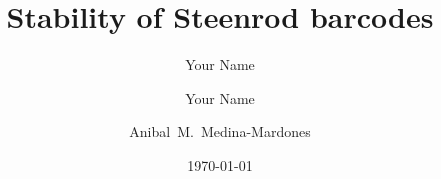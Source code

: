 \documentclass{amsart}
\title{Stability of Steenrod barcodes}
\author[Your short name]{Your Name}
\author[Your short name]{Your Name}
\author[A.~Medina-Mardones]{Anibal~M.~Medina-Mardones}
\date{\today}
\begin{document}
	
	\maketitle
	
	
	
	
	
	
	\sloppy
	\printbibliography
%	
\end{document}
